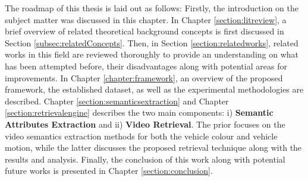 The roadmap of this thesis is laid out as follows: Firstly, the introduction on the subject matter was discussed in this chapter.
In Chapter \ref{section:litreview}, a brief overview of related theoretical background concepts is first discussed in Section \ref{subsec:relatedConcepts}. Then, in Section \ref{section:relatedworks}, related works in this field are reviewed thoroughly to provide an understanding on what has been attempted before, their disadvantages along with potential areas for improvements.
In Chapter \ref{chapter:framework}, an overview of the proposed framework, the established dataset, as well as the experimental methodologies are described.
Chapter \ref{section:semanticsextraction} and Chapter \ref{section:retrievalengine} describes the two main components: i) \textbf{Semantic Attributes Extraction} and ii) \textbf{Video Retrieval}. 
The prior focuses on the video semantics extraction methods for both the vehicle colour and vehicle motion, while the latter discusses the proposed retrieval technique along with the results and analysis.
Finally, the conclusion of this work along with potential future works is presented in Chapter \ref{section:conclusion}.
